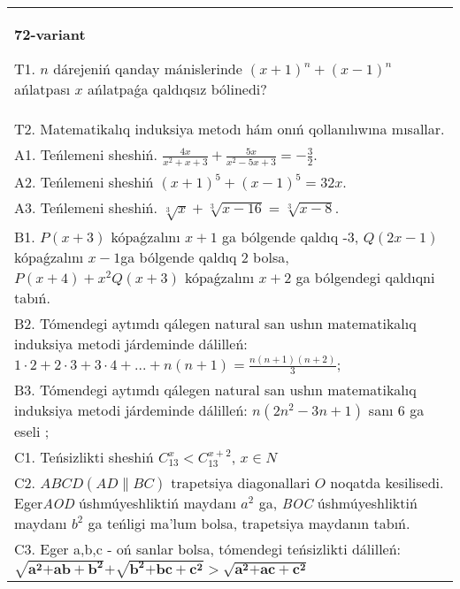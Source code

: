 \documentclass{article}
\begin{document}
\begin{tabular}{m{17cm}}
\textbf{72-variant}
\newline

T1. \(n\) dárejeniń qanday mánislerinde \((x + 1)^{n} + (x - 1)^{n}\) ańlatpası \(x\) ańlatpaǵa qaldıqsız bólinedi? \\
T2. Matematikalıq induksiya metodı hám onıń qollanılıwına mısallar. \\
A1. Teńlemeni sheshiń. \(\frac{4x}{x^{2} + x + 3} + \frac{5x}{x^{2} - 5x + 3} = - \frac{3}{2}\). \\
A2. Teńlemeni sheshiń \((x + 1)^{5} + (x - 1)^{5} = 32x\). \\
A3. Teńlemeni sheshiń. \(\sqrt[3]{x} + \sqrt[3]{x - 16} = \sqrt[3]{x - 8}\). \\
B1. \(P(x + 3)\) kópaǵzalını \(x + 1\) ga bólgende qaldıq -3, \(Q(2x - 1)\) kópaǵzalını \(x - 1\)ga bólgende qaldıq 2 bolsa, \(P(x + 4) + x^{2}Q(x + 3)\) kópaǵzalını \(x + 2\) ga bólgendegi qaldıqni tabıń. \\
B2. Tómendegi aytımdı qálegen natural san ushın matematikalıq induksiya metodi járdeminde dálilleń: \(1 \cdot 2 + 2 \cdot 3 + 3 \cdot 4 + ... + n(n + 1) = \frac{n(n + 1)(n + 2)}{3}\); \\
B3. Tómendegi aytımdı qálegen natural san ushın matematikalıq induksiya metodi járdeminde dálilleń: \(n\left( 2n^{2} - 3n + 1 \right)\) sanı 6 ga eseli ; \\
C1. Teńsizlikti sheshiń \(C_{13}^{x} < C_{13}^{x + 2}\), \(x \in N\) \\
C2. \(ABCD(AD\| BC)\) trapetsiya diagonallari \(O\) noqatda kesilisedi. Eger\emph{AOD} úshmúyeshliktiń maydanı \(a^{2}\) ga, \emph{BOC} úshmúyeshliktiń maydanı \(b^{2}\) ga teńligi ma'lum bolsa, trapetsiya maydanın tabıń. \\
C3. Eger a,b,c - oń sanlar bolsa, tómendegi teńsizlikti dálilleń: \(\sqrt{\mathbf{a}^{\mathbf{2}}\mathbf{+ ab +}\mathbf{b}^{\mathbf{2}}}\mathbf{+}\sqrt{\mathbf{b}^{\mathbf{2}}\mathbf{+ bc +}\mathbf{c}^{\mathbf{2}}}\mathbf{>}\sqrt{\mathbf{a}^{\mathbf{2}}\mathbf{+ ac +}\mathbf{c}^{\mathbf{2}}}\) \\

\end{tabular}
\vspace{1cm}
\end{document}
